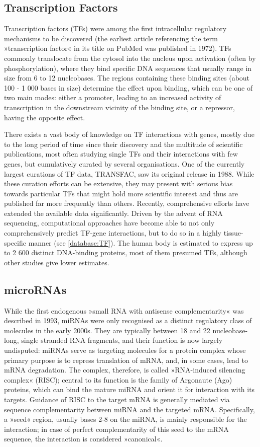\subsection{Transcription Factors} \label{intro:TFs}
Transcription factors (TFs) were among the first intracellular regulatory mechanisms to be discovered (the earliest article referencing the term »transcription factor« in its title on PubMed was published in 1972). TFs commonly translocate from the cytosol into the nucleus upon activation (often by phosphorylation), where they bind specific DNA sequences that usually range in size from 6 to 12 nucleobases. The regions containing these binding sites (about 100 - 1 000 bases in size) determine the effect upon binding, which can be one of two main modes: either a promoter, leading to an increased activity of transcription in the downstream vicinity of the binding site, or a repressor, having the opposite effect. 

There exists a vast body of knowledge on TF interactions with genes, mostly due to the long period of time since their discovery and the multitude of scientific publications, most often studying single TFs and their interactions with few genes, but cumulatively curated by several organisations. One of the currently largest curations of TF data, TRANSFAC, saw its original release in 1988. While these curation efforts can be extensive, they may present with serious bias towards particular TFs that might hold more scientific interest and thus are published far more frequently than others. Recently, comprehensive efforts have extended the available data significantly. Driven by the advent of RNA sequencing, computational approaches have become able to not only comprehensively predict TF-gene interactions, but to do so in a highly tissue-specific manner (see \ref{database:TF}). The human body is estimated to express up to 2 600 distinct DNA-binding proteins, most of them presumed TFs\cite{Babu2004}, although other studies give lower estimates. 

\subsection{microRNAs} \label{intro:miRNAs}
While the first endogenous »small RNA with antisense complementarity« was described in 1993\cite{Lee1993}, miRNAs were only recognised as a distinct regulatory class of molecules in the early 2000s. They are typically between 18 and 22 nucleobase-long, single stranded RNA fragments, and their function is now largely undisputed: miRNAs serve as targeting molecules for a protein complex whose primary purpose is to repress translation of mRNA, and, in some cases, lead to mRNA degradation. The complex, therefore, is called »RNA-induced silencing complex« (RISC); central to its function is the family of Argonaute (Ago) proteins, which can bind the mature miRNA and orient it for interaction with its targets. Guidance of RISC to the target mRNA is generally mediated via sequence complementarity between miRNA and the targeted mRNA. Specifically, a »seed« region, usually bases 2-8 on the miRNA, is mainly responsible for the interaction; in case of perfect complementarity of this seed to the mRNA sequence, the interaction is considered »canonical«.

